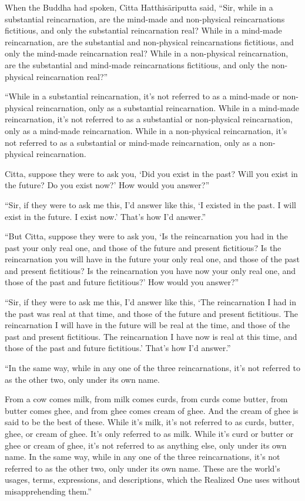 \documentclass[12pt,openany]{book}%
\begin{document}
When the Buddha had spoken, Citta \textsanskrit{Hatthisāriputta} said, “Sir, while in a substantial reincarnation, are the mind-made and non-physical reincarnations fictitious, and only the substantial reincarnation real? While in a mind-made reincarnation, are the substantial and non-physical reincarnations fictitious, and only the mind-made reincarnation real? While in a non-physical reincarnation, are the substantial and mind-made reincarnations fictitious, and only the non-physical reincarnation real?” 

“While in a substantial reincarnation, it’s not referred to as a mind-made or non-physical reincarnation, only as a substantial reincarnation. While in a mind-made reincarnation, it’s not referred to as a substantial or non-physical reincarnation, only as a mind-made reincarnation. While in a non-physical reincarnation, it’s not referred to as a substantial or mind-made reincarnation, only as a non-physical reincarnation. 

Citta, suppose they were to ask you, ‘Did you exist in the past? Will you exist in the future? Do you exist now?’ How would you answer?” 

“Sir, if they were to ask me this, I’d answer like this, ‘I existed in the past. I will exist in the future. I exist now.’ That’s how I’d answer.” 

“But Citta, suppose they were to ask you, ‘Is the reincarnation you had in the past your only real one, and those of the future and present fictitious? Is the reincarnation you will have in the future your only real one, and those of the past and present fictitious? Is the reincarnation you have now your only real one, and those of the past and future fictitious?’ How would you answer?” 

“Sir, if they were to ask me this, I’d answer like this, ‘The reincarnation I had in the past was real at that time, and those of the future and present fictitious. The reincarnation I will have in the future will be real at the time, and those of the past and present fictitious. The reincarnation I have now is real at this time, and those of the past and future fictitious.’ That’s how I’d answer.” 

“In the same way, while in any one of the three reincarnations, it’s not referred to as the other two, only under its own name. 

From a cow comes milk, from milk comes curds, from curds come butter, from butter comes ghee, and from ghee comes cream of ghee. And the cream of ghee is said to be the best of these. While it’s milk, it’s not referred to as curds, butter, ghee, or cream of ghee. It’s only referred to as milk. While it’s curd or butter or ghee or cream of ghee, it’s not referred to as anything else, only under its own name. In the same way, while in any one of the three reincarnations, it’s not referred to as the other two, only under its own name. These are the world’s usages, terms, expressions, and descriptions, which the Realized One uses without misapprehending them.” 
\end{document}

